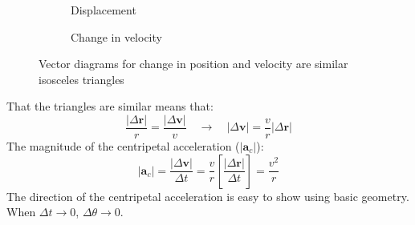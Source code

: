 \begin{figure}[ht]
  \centering
  \begin{subfigure}{.4\linewidth}
    \centering
    \caption{Displacement}
  \end{subfigure}
  \begin{subfigure}{.4\linewidth}
    \centering
    \caption{Change in velocity}
  \end{subfigure}
  \caption{Vector diagrams for change in position and velocity are similar
    isosceles triangles}
  \label{fig:sim-triangles}
\end{figure}



That the triangles are similar means that:
\begin{equation}
  \frac{|\Delta\bm r|}r=\frac{|\Delta\bm v|}v
  \quad\rightarrow\quad
  |\Delta\bm v|=\frac vr|\Delta\bm r|
\end{equation}
The magnitude of the centripetal acceleration ($|\bm a_c|$):
\begin{equation}
  |\bm a_c|=\frac{|\Delta\bm v|}{\Delta t}
  =\frac vr\left[\frac{|\Delta\bm r|}{\Delta t}\right]=\frac{v^2}r
\end{equation}
The direction of the centripetal acceleration is easy to show using basic
geometry. When $\Delta t\rightarrow 0$, $\Delta\theta\rightarrow 0$.


